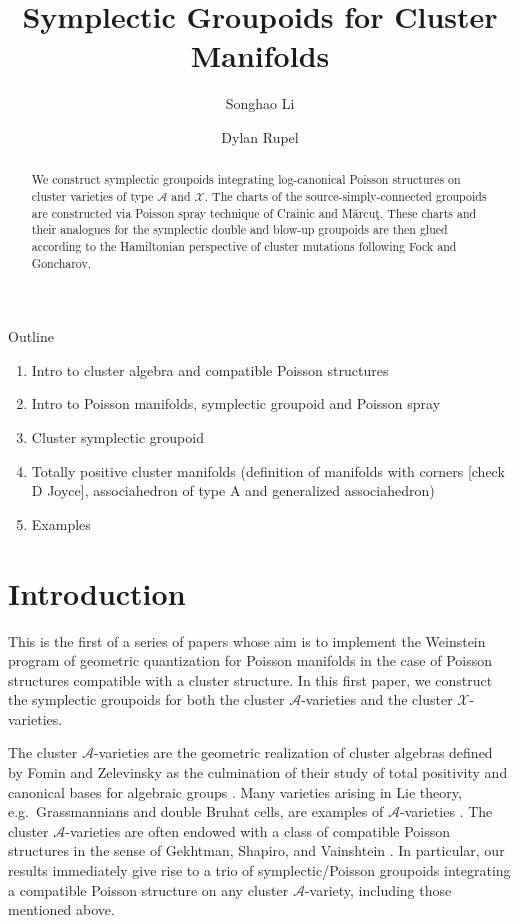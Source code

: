 \documentclass{amsart}
\title{Symplectic Groupoids for Cluster Manifolds}
\author{Songhao Li}
\author{Dylan Rupel}
\numberwithin{equation}{section}
\newcommand{\cA}{\mathcal{A}}
\newcommand{\cX}{\mathcal{X}}
\begin{document}
\begin{abstract}
  We construct symplectic groupoids integrating log-canonical Poisson structures on cluster varieties of type $\cA$ and $\cX$.
  The charts of the source-simply-connected groupoids are constructed via Poisson spray technique of Crainic and M\u{a}rcu\c{t}.
  These charts and their analogues for the symplectic double and blow-up groupoids are then glued according to the Hamiltonian perspective of cluster mutations following Fock and Goncharov.
\end{abstract}
\maketitle
Outline
\begin{enumerate}
	\item Intro to cluster algebra and compatible Poisson structures 
	\item Intro to Poisson manifolds, symplectic groupoid and Poisson spray
	\item Cluster symplectic groupoid
	\item Totally positive cluster manifolds (definition of manifolds with corners [check D Joyce], associahedron of type A and generalized associahedron)
	\item Examples
\end{enumerate}

\section{Introduction}
This is the first of a series of papers whose aim is to implement the Weinstein program of geometric quantization for Poisson manifolds \cite{MR1104934} in the case of Poisson structures compatible with a cluster structure.
In this first paper, we construct the symplectic groupoids for both the cluster $\cA$-varieties and the cluster $\cX$-varieties. 

The cluster $\cA$-varieties are the geometric realization of cluster algebras defined by Fomin and Zelevinsky \cite{FZ02} as the culmination of their study of total positivity and canonical bases for algebraic groups \cite{BFZ98}.
Many varieties arising in Lie theory, e.g.\ Grassmannians and double Bruhat cells, are examples of $\cA$-varieties \cite{BFZ05,scott,gekhtman-shapiro-vainshtein,Wil13b}.
The cluster $\cA$-varieties are often endowed with a class of compatible Poisson structures in the sense of Gekhtman, Shapiro, and Vainshtein \cite{GSV10}.
In particular, our results immediately give rise to a trio of symplectic/Poisson groupoids integrating a compatible Poisson structure on any cluster $\cA$-variety, including those mentioned above. 
\end{document}
